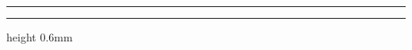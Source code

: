 \begin{titlepage}
  \sffamily
  \setlength{\parskip}{0pt}
  \setlength{\parindent}{0pt}
  \raggedright

  \begin{minipage}[t]{0.4\textwidth}
    \vspace{0pt}
    \ifINDA{\large\bfseries\color{IAccent}\INDAText}\fi
  \end{minipage}%
  \hfill
  \begin{minipage}[t]{0.58\textwidth}
    \vspace{0pt}\raggedleft
    \ifILogo\ILogo\fi
  \end{minipage}

  \vspace{38mm}

  {\color{IAccent}\rule{30mm}{1.5mm}}\par
  \vspace{7mm}
  {\small\bfseries\color{IAccent}\MakeUppercase{\IreportKindName}\par}
  \vspace{4mm}

  {\fontsize{22pt}{27pt}\selectfont\bfseries \IreportTitle\par}
  \ifdefempty{\IreportSubtitle}{}{%
    \vspace{4mm}{\Large \IreportSubtitle\par}}
  \vspace{12mm}

  {\large\bfseries \IreportAuthor\par}
  \vspace{1mm}
  {\small \IAuthorDetails}

  \vfill

  {\small \IInfoBlock}
  \vspace{8mm}

  {\color{IAccent}\hrule height 0.6mm}
  \vspace{2mm}
  {\small\bfseries \Iuniversity\par}
  {\small \Ifaculty\par}
  \ifIEnglish\else{\footnotesize\color{gray} \IuniversityEN\par}\fi
\end{titlepage}
